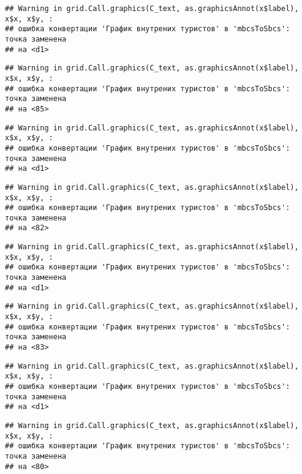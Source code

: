 \documentclass[
]{article}
\begin{document}
\begin{verbatim}
## Warning in grid.Call.graphics(C_text, as.graphicsAnnot(x$label), x$x, x$y, :
## ошибка конвертации 'График внутрених туристов' в 'mbcsToSbcs': точка заменена
## на <d1>
\end{verbatim}

\begin{verbatim}
## Warning in grid.Call.graphics(C_text, as.graphicsAnnot(x$label), x$x, x$y, :
## ошибка конвертации 'График внутрених туристов' в 'mbcsToSbcs': точка заменена
## на <85>
\end{verbatim}

\begin{verbatim}
## Warning in grid.Call.graphics(C_text, as.graphicsAnnot(x$label), x$x, x$y, :
## ошибка конвертации 'График внутрених туристов' в 'mbcsToSbcs': точка заменена
## на <d1>
\end{verbatim}

\begin{verbatim}
## Warning in grid.Call.graphics(C_text, as.graphicsAnnot(x$label), x$x, x$y, :
## ошибка конвертации 'График внутрених туристов' в 'mbcsToSbcs': точка заменена
## на <82>
\end{verbatim}

\begin{verbatim}
## Warning in grid.Call.graphics(C_text, as.graphicsAnnot(x$label), x$x, x$y, :
## ошибка конвертации 'График внутрених туристов' в 'mbcsToSbcs': точка заменена
## на <d1>
\end{verbatim}

\begin{verbatim}
## Warning in grid.Call.graphics(C_text, as.graphicsAnnot(x$label), x$x, x$y, :
## ошибка конвертации 'График внутрених туристов' в 'mbcsToSbcs': точка заменена
## на <83>
\end{verbatim}

\begin{verbatim}
## Warning in grid.Call.graphics(C_text, as.graphicsAnnot(x$label), x$x, x$y, :
## ошибка конвертации 'График внутрених туристов' в 'mbcsToSbcs': точка заменена
## на <d1>
\end{verbatim}

\begin{verbatim}
## Warning in grid.Call.graphics(C_text, as.graphicsAnnot(x$label), x$x, x$y, :
## ошибка конвертации 'График внутрених туристов' в 'mbcsToSbcs': точка заменена
## на <80>
\end{verbatim}
\end{document}

